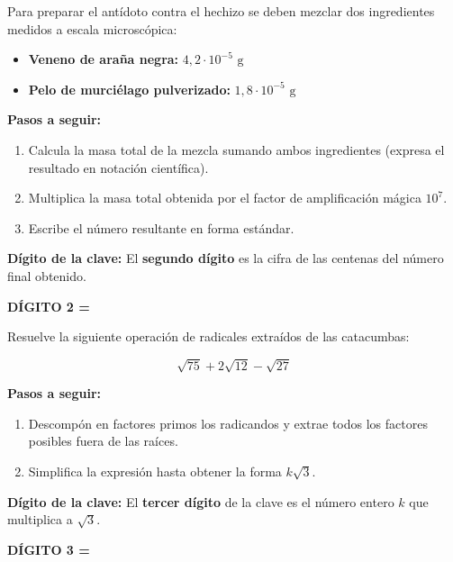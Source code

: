 \documentclass[a4paper,12pt]{article}
\begin{document}

\begin{tcolorbox}[title= PRUEBA 2: El Polvo de Estrellas (Segunda Cifra)]
Para preparar el antídoto contra el hechizo se deben mezclar dos ingredientes medidos a escala microscópica:
\begin{itemize}[leftmargin=1.5em]
    \item \textbf{Veneno de araña negra:} $4{,}2 \cdot 10^{-5}\text{ g}$
    \item \textbf{Pelo de murciélago pulverizado:} $1{,}8 \cdot 10^{-5}\text{ g}$
\end{itemize}

\textbf{Pasos a seguir:}
\begin{enumerate}
    \item Calcula la masa total de la mezcla sumando ambos ingredientes (expresa el resultado en notación científica).
    \item Multiplica la masa total obtenida por el factor de amplificación mágica $10^7$.
    \item Escribe el número resultante en forma estándar.
\end{enumerate}

\textbf{Dígito de la clave:} El \textbf{segundo dígito} es la cifra de las centenas del número final obtenido.

\hfill \textbf{DÍGITO 2 = } 
\end{tcolorbox}



\begin{tcolorbox}[title= PRUEBA 3: Las Raíces de la Tumba (Tercera Cifra)]
Resuelve la siguiente operación de radicales extraídos de las catacumbas:

\[
\sqrt{75} + 2\sqrt{12} - \sqrt{27}
\]

\textbf{Pasos a seguir:}
\begin{enumerate}
    \item Descompón en factores primos los radicandos y extrae todos los factores posibles fuera de las raíces.
    \item Simplifica la expresión hasta obtener la forma $k\sqrt{3}$.
\end{enumerate}

\textbf{Dígito de la clave:} El \textbf{tercer dígito} de la clave es el número entero $k$ que multiplica a $\sqrt{3}$.

\hfill \textbf{DÍGITO 3 = } 
\end{tcolorbox}
\end{document}
